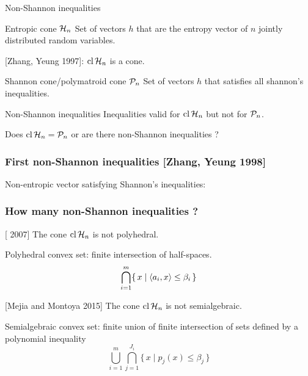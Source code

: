 \documentclass[10pt,svgnames,usenames,table]{beamer}
\begin{document}
  \begin{frame}{Non-Shannon inequalities}
    \begin{block}{Entropic cone $\mathcal{H}_{n}$}
      Set of vectors $h$ that are the entropy vector of $n$ jointly distributed random variables.

      [Zhang, Yeung 1997]: $\operatorname{cl}{\mathcal{H}_{n}}$ is a cone.
    \end{block}
    \begin{block}{Shannon cone/polymatroid cone $\mathcal{P}_{n}$}
      Set of vectors $h$ that satisfies all shannon's inequalities.
    \end{block}
    \begin{block}{Non-Shannon inequalities}
      Inequalities valid for $\operatorname{cl}{\mathcal{H}_{n}}$ but not for $\mathcal{P}_{n}$.
    \end{block}

    Does $\operatorname{cl}{\mathcal{H}_{n}} = \mathcal{P}_{n}$ or are there non-Shannon inequalities ?
  \end{frame}

  \begin{frame}
    \frametitle{First non-Shannon inequalities [Zhang, Yeung 1998]}
    Non-entropic vector satisfying Shannon's inequalities:
  \end{frame}

  \begin{frame}
    \frametitle{How many non-Shannon inequalities ?}
    \begin{block}{[\matus{} 2007]}
      The cone $\operatorname{cl}{\mathcal{H}_{n}}$ is not polyhedral.

      Polyhedral convex set: finite intersection of half-spaces.
      \[ \bigcap_{i=1}^m \{\, x \mid \langle a_i, x \rangle \leq \beta_i \,\} \]
    \end{block}
    \begin{block}{[Mejia and Montoya 2015]}
      The cone $\operatorname{cl}{\mathcal{H}_{n}}$ is not semialgebraic.

      Semialgebraic convex set: finite union of finite intersection of sets defined by a polynomial inequality
      \[ \bigcup_{i=1}^m \bigcap_{j=1}^{J_i} \{\, x \mid p_j(x) \leq \beta_j \,\} \]
    \end{block}
  \end{frame}
\end{document}
